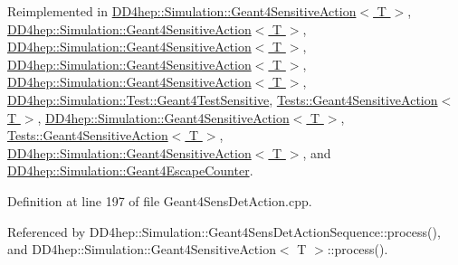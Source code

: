 Reimplemented in \hyperlink{class_d_d4hep_1_1_simulation_1_1_geant4_sensitive_action_a36759982ed0876a5ce81c14973c18077}{D\+D4hep\+::\+Simulation\+::\+Geant4\+Sensitive\+Action$<$ T $>$}, \hyperlink{class_d_d4hep_1_1_simulation_1_1_geant4_sensitive_action_a0788632157d0928128a95e0cead244db}{D\+D4hep\+::\+Simulation\+::\+Geant4\+Sensitive\+Action$<$ T $>$}, \hyperlink{class_d_d4hep_1_1_simulation_1_1_geant4_sensitive_action_ad11ea4c3e4623fb5e2a8851d1aebb5c7}{D\+D4hep\+::\+Simulation\+::\+Geant4\+Sensitive\+Action$<$ T $>$}, \hyperlink{class_d_d4hep_1_1_simulation_1_1_geant4_sensitive_action_a8a81f39616ed1de4b54b57f3f719320f}{D\+D4hep\+::\+Simulation\+::\+Geant4\+Sensitive\+Action$<$ T $>$}, \hyperlink{class_d_d4hep_1_1_simulation_1_1_geant4_sensitive_action_a50bfc45c3c70ee5e944dfb06085b297c}{D\+D4hep\+::\+Simulation\+::\+Geant4\+Sensitive\+Action$<$ T $>$}, \hyperlink{class_d_d4hep_1_1_simulation_1_1_test_1_1_geant4_test_sensitive_aa5d824cbc3f5bfdd8e03236c8aec07ed}{D\+D4hep\+::\+Simulation\+::\+Test\+::\+Geant4\+Test\+Sensitive}, \hyperlink{class_tests_1_1_geant4_sensitive_action_aff7223d28e073cbcb4e2347f9514ba75}{Tests\+::\+Geant4\+Sensitive\+Action$<$ T $>$}, \hyperlink{class_d_d4hep_1_1_simulation_1_1_geant4_sensitive_action_ae88bc077d1d117f45a9952e2ca25e64f}{D\+D4hep\+::\+Simulation\+::\+Geant4\+Sensitive\+Action$<$ T $>$}, \hyperlink{class_tests_1_1_geant4_sensitive_action_a6ae919f9aeb71219a38300d3918ed814}{Tests\+::\+Geant4\+Sensitive\+Action$<$ T $>$}, \hyperlink{class_d_d4hep_1_1_simulation_1_1_geant4_sensitive_action_a2fa425bb9c1d9bc1276fcac2fd86984d}{D\+D4hep\+::\+Simulation\+::\+Geant4\+Sensitive\+Action$<$ T $>$}, and \hyperlink{class_d_d4hep_1_1_simulation_1_1_geant4_escape_counter_a869bbe150025b9798af6ab7487d225de}{D\+D4hep\+::\+Simulation\+::\+Geant4\+Escape\+Counter}.



Definition at line 197 of file Geant4\+Sens\+Det\+Action.\+cpp.



Referenced by D\+D4hep\+::\+Simulation\+::\+Geant4\+Sens\+Det\+Action\+Sequence\+::process(), and D\+D4hep\+::\+Simulation\+::\+Geant4\+Sensitive\+Action$<$ T $>$\+::process().

\hypertarget{class_d_d4hep_1_1_simulation_1_1_geant4_sensitive_a083cae521f044d12130c5325dbee69bf}{}\label{class_d_d4hep_1_1_simulation_1_1_geant4_sensitive_a083cae521f044d12130c5325dbee69bf} 
